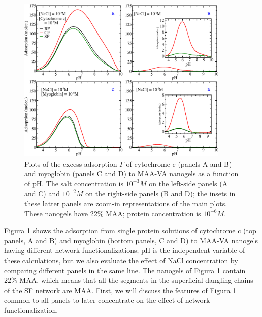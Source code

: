 \begin{figure}[!htb]
\includegraphics[width=0.9\textwidth]{Figures/graphs-gel2/abcd.png}
\caption{Plots of the excess adsorption $\Gamma$ of cytochrome c (panels A and B) and myoglobin (panels C and D) to MAA-VA nanogels as a function of pH. 
The salt concentration is $10^{-3}M$ on the left-side panels (A and C) and $10^{-2}M$ on the right-side panels
(B and D); the insets in these latter panels are zoom-in representations of the main plots.
These nanogels have 22\% MAA; protein concentration is $10^{-6}M$.}
\label{fig:adsorption-vs-pH-cyto-myo}
\end{figure}



Figura \ref{fig:adsorption-vs-pH-cyto-myo} shows the adsorption from single protein solutions of cytochrome c (top panels, A and B) and myoglobin (bottom panels, C and D) to MAA-VA nanogels having different network functionalizations;
pH is the independent variable of these calculations, but we also evaluate the effect of NaCl concentration by comparing different panels in the same line.
The nanogels of Figura \ref{fig:adsorption-vs-pH-cyto-myo} contain $22\%$ MAA, which means that all the segments in the superficial dangling chains of the SF network are MAA.
First, we will discuss the features of Figura \ref{fig:adsorption-vs-pH-cyto-myo} common to all panels to later concentrate on the effect of network functionalization.



